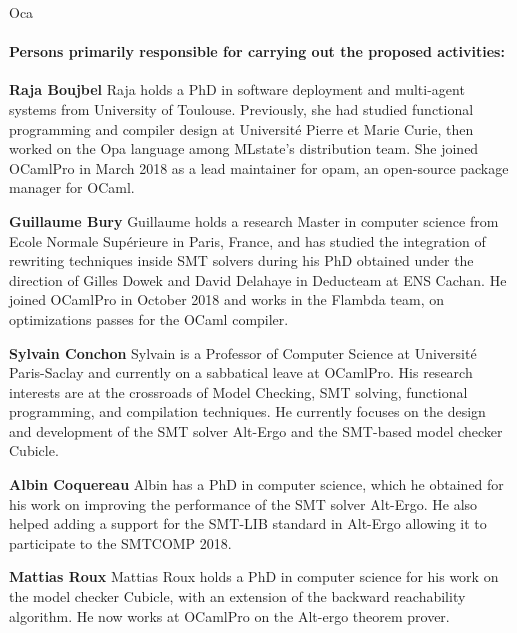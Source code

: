 \begin{sitedescription}{Oca}
\paragraph*{Persons primarily responsible for carrying out the proposed activities:}

\begin{compactitem} %
  \item{\bf Raja Boujbel} Raja holds a PhD in software deployment and
    multi-agent systems from University of Toulouse. Previously, she had studied
    functional programming and compiler design at Université Pierre et Marie
    Curie, then worked on the Opa language among MLstate’s distribution team.
    She joined OCamlPro in March 2018 as a lead maintainer for opam, an
    open-source package manager for OCaml.
\item{\bf Guillaume Bury} Guillaume holds a research Master in computer
    science from Ecole Normale Supérieure in Paris, France, and has studied the
    integration of rewriting techniques inside SMT solvers during his PhD
    obtained under the direction of Gilles Dowek and David Delahaye in
    Deducteam at ENS Cachan. He joined OCamlPro in October 2018 and works in
    the Flambda team, on optimizations passes for the OCaml compiler.
\item{\bf Sylvain Conchon} Sylvain is a Professor of Computer
    Science at Université Paris-Saclay and currently on a sabbatical
    leave at OCamlPro. His research interests are at the crossroads of
    Model Checking, SMT solving, functional programming, and
    compilation techniques. He currently focuses on the design and
    development of the SMT solver Alt-Ergo and the SMT-based model
    checker Cubicle.
\item{\bf Albin Coquereau} Albin has a PhD in computer science,
    which he obtained for his work on improving the performance of the SMT
    solver Alt-Ergo. He also helped adding a support for the SMT-LIB standard
    in Alt-Ergo allowing it to participate to the SMTCOMP 2018.
\item{\bf Mattias Roux} Mattias Roux holds a PhD in computer science
    for his work on the model checker Cubicle, with an extension of the backward
    reachability algorithm. He now works at OCamlPro on the Alt-ergo theorem
    prover.
\end{compactitem}

\end{sitedescription}

